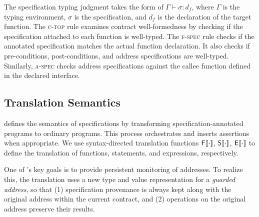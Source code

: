 The specification typing judgment takes the form of $\Gamma \vdash \sigma : d_f$, where $\Gamma$ is the typing environment, $\sigma$ is the specification, and $d_f$ is the declaration of the target function. The \textsc{c-top} rule examines contract well-formedness by checking if the specification 
attached to each function is well-typed. 
The \textsc{f-spec} rule checks if the annotated specification matches the actual function
declaration. It also checks if pre-conditions, post-conditions, and address specifications
are well-typed.
Similarly,
\textsc{a-spec} checks address specifications against
the callee function defined in the declared interface.


\subsection{Translation Semantics} \label{sec:translation}


 defines the semantics of specifications by transforming 
specification-annotated programs to ordinary programs. 
This process orchestrates and inserts assertions when appropriate.
We use syntax-directed translation functions $\mathsf{F}\llbracket{\cdot}\rrbracket$, $\mathsf{S}\llbracket{\cdot}\rrbracket$,
$\mathsf{E}\llbracket{\cdot}\rrbracket$ to define the translation of functions, statements, and expressions, respectively.


One of \lang's key goals is to provide persistent monitoring of addresses.
To realize this, the translation uses a new type and value 
representation for a \emph{guarded address}, so that (1) specification
provenance is always kept along with the original address within the current contract,
and (2) operations on the original address preserve their results.

